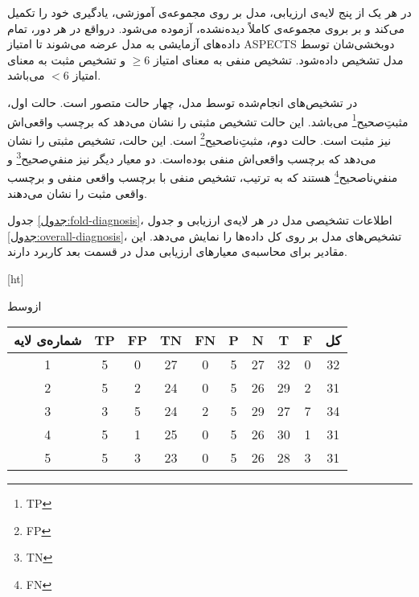 در هر یک از پنج لایه‌ی ارزیابی، مدل بر روی مجموعه‌ی آموزشی، یادگیری خود را تکمیل می‌کند و بر بروی
 مجموعه‌ی کاملاً دیده‌نشده، آزموده می‌شود.
 درواقع در هر دور، تمام داده‌های آزمایشی به مدل عرضه می‌شوند تا امتیاز ASPECTS دو‌بخشی‌شان توسط مدل تشخیص داده‌شود.
تشخیص منفی به معنای امتیاز $\geq 6$ و تشخیص مثبت به معنای امتیاز $<6$ می‌باشد.

در تشخیص‌های انجام‌شده توسط مدل، چهار حالت متصور است.
حالت اول، 
مثبتِ‌صحیح\footnote{TP}
می‌باشد.
این حالت تشخیص مثبتی را نشان می‌دهد که برچسب واقعی‌اش نیز مثبت است.
حالت دوم، 
مثبتِ‌ناصحیح\footnote{FP}
است.
این حالت، تشخیص مثبتی را نشان می‌دهد که برچسب واقعی‌اش منفی بوده‌است.
دو معیار دیگر نیز 
منفیِ‌صحیح\footnote{TN}
و منفیِ‌ناصحیح\footnote{FN}
هستند که به ترتیب، تشخیص منفی با برچسب واقعی منفی و برچسب واقعی مثبت را نشان می‌دهند.

جدول \ref{جدول:fold-diagnosis}، اطلاعات تشخیصی مدل در
هر لایه‌ی ارزیابی و جدول \ref{جدول:overall-diagnosis}،
تشخیص‌های مدل بر روی کل داده‌ها را نمایش می‌دهد.
این مقادیر برای محاسبه‌ی معیار‌های ارزیابی مدل در قسمت بعد کاربرد دارند.

[ht]

\vspace{1.5em}

‌ازوسط

\begin{tabular}{cccccccccc}
    \hline
     
    شماره‌ی لایه & TP & FP & TN & FN & P & N  & T  & F & کل\\ \hline
    1           & 5  & 0  & 27 & 0  & 5 & 27 & 32 & 0 & 32 \\ 
    2           & 5  & 2  & 24 & 0  & 5 & 26 & 29 & 2 & 31\\ 
    3           & 3  & 5  & 24 & 2  & 5 & 29 & 27 & 7 & 34\\ 
    4           & 5  & 1  & 25 & 0  & 5 & 26 & 30 & 1 & 31\\ 
    5           & 5  & 3  & 23 & 0  & 5 & 26 & 28 & 3 & 31\\ \hline
    \end{tabular}


